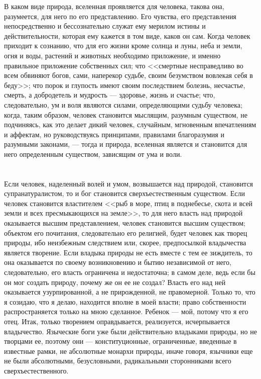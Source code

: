 \documentclass[12pt]{article}
\begin{document}
В каком виде природа, вселенная проявляется для человека, такова она, разумеется, для него по его представлению. Его чувства, его представления непосредственно и бессознательно служат ему мерилом истины и действительности, которая ему кажется в том виде, каков он сам. Когда человек приходит к сознанию, что для его жизни кроме солнца и луны, неба и земли, огня и воды, растений и животных необходимо приложение, и именно правильное приложение собственных сил; что <<смертные несправедливо во всем обвиняют богов, сами, наперекор судьбе, своим безумством вовлекая себя в беду>>; что порок и глупость имеют своим последствием болезнь, несчастье, смерть, а добродетель и мудрость --- здоровье, жизнь и счастье; что, следовательно, ум и воля являются силами, определяющими судьбу человека; когда, таким образом, человек становится мыслящим, разумным существом, не подчиняясь, как это делает дикий человек, случайным, мгновенным впечатлениям и аффектам, но руководствуясь принципами, правилами благоразумия и разумными законами, --- тогда и природа, вселенная является и становится для него определенным существом, зависящим от ума и воли.



\section{}

Если человек, наделенный волей и умом, возвышается над природой, становится супранатуралистом, то и бог становится сверхъестественным существом. Если человек становится властителем <<рыб в море, птиц в поднебесье, скота и всей земли и всех пресмыкающихся на земле>>, то для него власть над природой оказывается высшим представлением, человек становится высшим существом; объектом его почитания, следовательно его религией, будет человек как творец природы, ибо неизбежным следствием или, скорее, предпосылкой владычества является творение. Если владыка природы не есть вместе с тем ее зиждитель, то она оказывается по своему возникновению и бытию независимой от него, следовательно, его власть ограничена и недостаточна; в самом деле, ведь если бы он мог создать природу, почему же он ее не создал? Власть его над ней оказывается узурпированной, а не прирожденной, не правомерной. Только то, что я созидаю, что я делаю, находится вполне в моей власти; право собственности распространяется только на мною сделанное. Ребенок --- мой, потому что я его отец. Итак, только творением оправдывается, реализуется, исчерпывается владычество. Языческие боги уже были действительно владыками природы, но не творцами ее, поэтому они --- конституционные, ограниченные, введенные в известные рамки, не абсолютные монархи природы, иначе говоря, язычники еще не были абсолютными, безусловными, радикальными сторонниками всего сверхъестественного.
\end{document}
